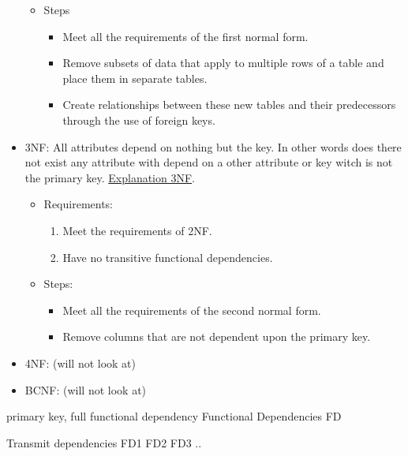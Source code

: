 \documentclass{article}
\begin{document}
\begin{itemize}
\begin{itemize}
\begin{enumerate}
        \end{enumerate}
        \item Steps
        \begin{itemize}
            \item Meet all the requirements of the first normal form.
            \item Remove subsets of data that apply to multiple rows of a table and place them in separate tables.
            \item Create relationships between these new tables and their predecessors through the use of foreign keys.
        \end{itemize}
    \end{itemize}
    \item 3NF: All attributes depend on nothing but the key. In other words 
    does there not exist any attribute with depend on a other attribute or key
    witch is not the primary key.
    \href{https://www.youtube.com/watch?v=aAx_JoEDXQA}{Explanation 3NF}.
    \begin{itemize}
        \item Requirements:
        \begin{enumerate}
            \item Meet the requirements of 2NF.
            \item Have no transitive functional dependencies.
        \end{enumerate}
        \item Steps:
        \begin{itemize}
            \item Meet all the requirements of the second normal form.
            \item Remove columns that are not dependent upon the primary key.
        \end{itemize}
    \end{itemize}
    \item 4NF: (will not look at)
    \item BCNF: (will not look at)
\end{itemize}

primary key, full functional dependency
Functional Dependencies FD

Transmit dependencies FD1 FD2 FD3 ..

\newpage
\end{document}
